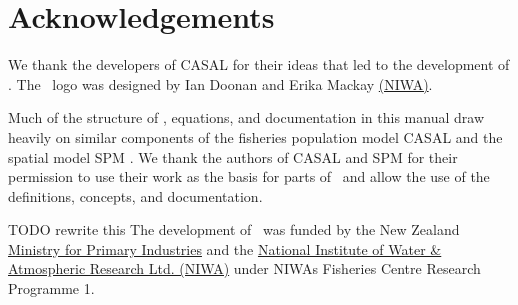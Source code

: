 \section{Acknowledgements\label{sec:acknowledgements}}

We thank the developers of CASAL \citep{1388} for their ideas that led to the development of \CNAME. The \CNAME\ logo was designed by Ian Doonan and Erika Mackay \href{http://www.niwa.co.nz}{(NIWA)}.

Much of the structure of \CNAME, equations, and documentation in this manual draw heavily on similar components of the fisheries population model CASAL \citep{1388} and  the spatial model SPM \citep{SPM}. We thank the authors of CASAL and SPM for their permission to use their work as the basis for parts of \CNAME\ and allow the use of the definitions, concepts, and documentation.

TODO rewrite this
The development of \CNAME\ was funded by the New Zealand \href{http://www.mpi.govt.nz}{Ministry for Primary Industries} and the \href{http://www.niwa.co.nz}{National Institute of Water \& Atmospheric Research Ltd. (NIWA)} under NIWAs Fisheries Centre Research Programme 1.
